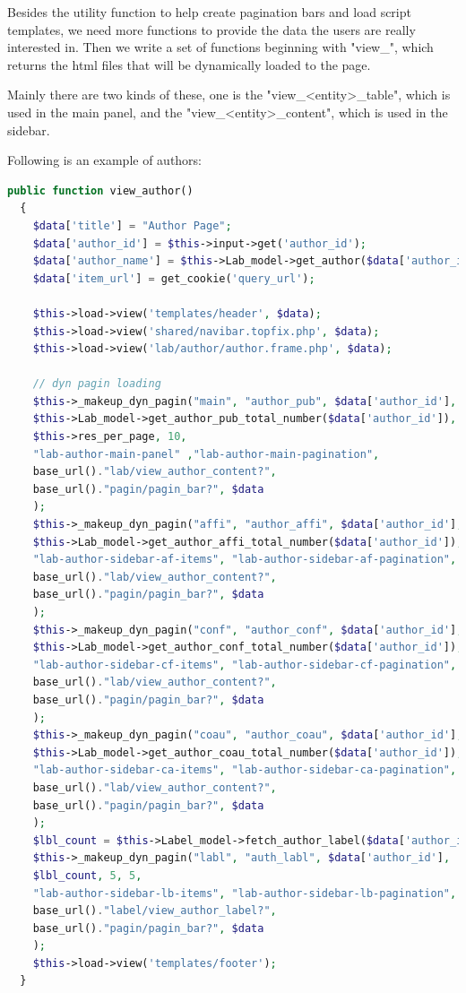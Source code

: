 \documentclass[a4paper, 10pt]{article}
\begin{document}
Besides the utility function to help create pagination bars and load script templates, we need more functions to provide the data the users are really interested in. Then we write a set of functions beginning with "view\_", which returns the html files that will be dynamically loaded to the page.

Mainly there are two kinds of these, one is the "view\_<entity>\_table", which is used in the main panel, and the "view\_<entity>\_content", which is used in the sidebar.

Following is an example of authors:
\begin{lstlisting}[language=php]
  public function view_author()
  {
    $data['title'] = "Author Page";
    $data['author_id'] = $this->input->get('author_id');
    $data['author_name'] = $this->Lab_model->get_author($data['author_id'])['AuthorName'];
    $data['item_url'] = get_cookie('query_url');
    
    $this->load->view('templates/header', $data);
    $this->load->view('shared/navibar.topfix.php', $data);
    $this->load->view('lab/author/author.frame.php', $data);

    // dyn pagin loading
    $this->_makeup_dyn_pagin("main", "author_pub", $data['author_id'],
    $this->Lab_model->get_author_pub_total_number($data['author_id']),
    $this->res_per_page, 10,
    "lab-author-main-panel" ,"lab-author-main-pagination",
    base_url()."lab/view_author_content?", 
    base_url()."pagin/pagin_bar?", $data
    );
    $this->_makeup_dyn_pagin("affi", "author_affi", $data['author_id'],
    $this->Lab_model->get_author_affi_total_number($data['author_id']), 5, 5,
    "lab-author-sidebar-af-items", "lab-author-sidebar-af-pagination",
    base_url()."lab/view_author_content?", 
    base_url()."pagin/pagin_bar?", $data
    );
    $this->_makeup_dyn_pagin("conf", "author_conf", $data['author_id'],
    $this->Lab_model->get_author_conf_total_number($data['author_id']), 5, 5,
    "lab-author-sidebar-cf-items", "lab-author-sidebar-cf-pagination",
    base_url()."lab/view_author_content?", 
    base_url()."pagin/pagin_bar?", $data
    );
    $this->_makeup_dyn_pagin("coau", "author_coau", $data['author_id'],
    $this->Lab_model->get_author_coau_total_number($data['author_id']), 5, 5,
    "lab-author-sidebar-ca-items", "lab-author-sidebar-ca-pagination",
    base_url()."lab/view_author_content?", 
    base_url()."pagin/pagin_bar?", $data
    );
    $lbl_count = $this->Label_model->fetch_author_label($data['author_id'],0,0)['num'];
    $this->_makeup_dyn_pagin("labl", "auth_labl", $data['author_id'],
    $lbl_count, 5, 5,
    "lab-author-sidebar-lb-items", "lab-author-sidebar-lb-pagination",
    base_url()."label/view_author_label?", 
    base_url()."pagin/pagin_bar?", $data
    );
    $this->load->view('templates/footer');
  }


\end{lstlisting}
\end{document}
